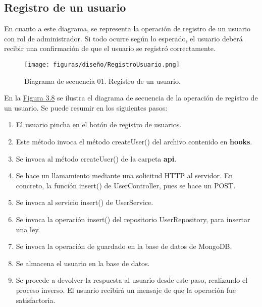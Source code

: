\subsection{Registro de un usuario}

En cuanto a este diagrama, se representa la operación de registro de un usuario con rol de administrador. Si todo ocurre según lo esperado, el usuario deberá recibir una confirmación de que el usuario se registró correctamente.

\begin{figure}[H]
\centerline{\texttt{[image: figuras/diseño/RegistroUsuario.png]}}
\caption{Diagrama de secuencia 01. Registro de un usuario.}
\label{enlaceDRegistro}
\end{figure}

En la \hyperref[enlaceDRegistro]{Figura 3.8} se ilustra el diagrama de secuencia de la operación de registro de un usuario. Se puede resumir en los siguientes pasos:

\begin{enumerate}
    \item El usuario pincha en el botón de registro de usuarios.
    \item Este método invoca el método createUser() del archivo contenido en  {\bf hooks}.
    \item Se invoca al método createUser() de la carpeta {\bf api}.
    \item Se hace un llamamiento mediante una solicitud HTTP al servidor. En concreto, la función insert() de UserController, pues se hace un POST.
    \item Se invoca al servicio insert() de UserService.
    \item Se invoca la operación insert() del repositorio UserRepository, para insertar una ley.
    \item Se invoca la operación de guardado en la base de datos de MongoDB.
    \item Se almacena el usuario en la base de datos.
    \item Se procede a devolver la respuesta al usuario desde este paso, realizando el proceso inverso. El usuario recibirá un mensaje de que la operación fue satisfactoria.
\end{enumerate}